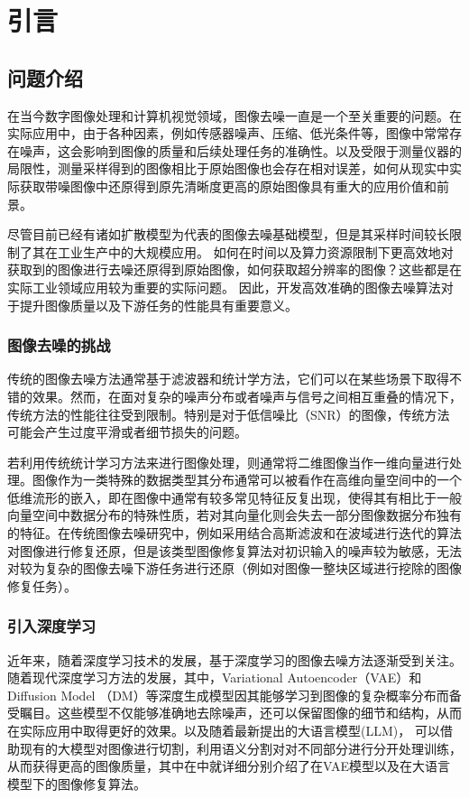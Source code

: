 \chapter{引言}
\section{问题介绍}

在当今数字图像处理和计算机视觉领域，图像去噪一直是一个至关重要的问题。在实际应用中，由于各种因素，例如传感器噪声、压缩、低光条件等，图像中常常存在噪声，这会影响到图像的质量和后续处理任务的准确性。以及受限于测量仪器的局限性，测量采样得到的图像相比于原始图像也会存在相对误差，如何从现实中实际获取带噪图像中还原得到原先清晰度更高的原始图像具有重大的应用价值和前景。     

尽管目前已经有诸如扩散模型为代表的图像去噪基础模型，但是其采样时间较长限制了其在工业生产中的大规模应用。 如何在时间以及算力资源限制下更高效地对获取到的图像进行去噪还原得到原始图像，如何获取超分辨率的图像？这些都是在实际工业领域应用较为重要的实际问题。 
因此，开发高效准确的图像去噪算法对于提升图像质量以及下游任务的性能具有重要意义。
\subsection*{图像去噪的挑战}
传统的图像去噪方法通常基于滤波器和统计学方法，它们可以在某些场景下取得不错的效果。然而，在面对复杂的噪声分布或者噪声与信号之间相互重叠的情况下，传统方法的性能往往受到限制。特别是对于低信噪比（SNR）的图像，传统方法可能会产生过度平滑或者细节损失的问题。      

若利用传统统计学习方法来进行图像处理，则通常将二维图像当作一维向量进行处理。图像作为一类特殊的数据类型其分布通常可以被看作在高维向量空间中的一个低维流形的嵌入，即在图像中通常有较多常见特征反复出现，使得其有相比于一般向量空间中数据分布的特殊性质，若对其向量化则会失去一部分图像数据分布独有的特征。在传统图像去噪研究中，例如\cite{DZGS202401008}采用结合高斯滤波和在波域进行迭代的算法对图像进行修复还原，但是该类型图像修复算法对初识输入的噪声较为敏感，无法对较为复杂的图像去噪下游任务进行还原（例如对图像一整块区域进行挖除的图像修复任务）。
\subsection*{引入深度学习}
近年来，随着深度学习技术的发展，基于深度学习的图像去噪方法逐渐受到关注。随着现代深度学习方法的发展，其中，Variational Autoencoder（VAE）和Diffusion Model （DM）等深度生成模型因其能够学习到图像的复杂概率分布而备受瞩目。这些模型不仅能够准确地去除噪声，还可以保留图像的细节和结构，从而在实际应用中取得更好的效果。以及随着最新提出的大语言模型(LLM)， 可以借助现有的大模型对图像进行切割，利用语义分割对对不同部分进行分开处理训练，从而获得更高的图像质量，其中在\cite{DM_review}中就详细分别介绍了在VAE模型以及在大语言模型下的图像修复算法。 
